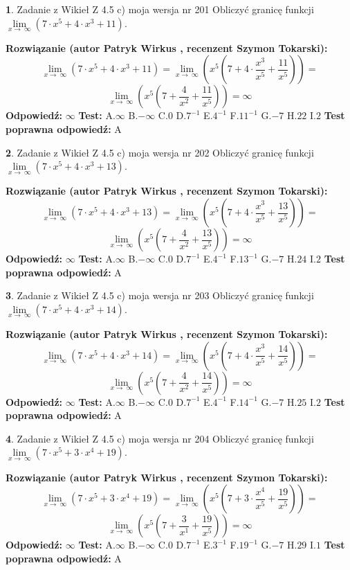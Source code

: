 \documentclass[12pt, a4paper]{article}
\theoremstyle{definition} %
\newtheorem{zad}{}
\newcommand{\zadStart}[1]{\begin{zad}#1\newline}
\newcommand{\zadStop}{\end{zad}}
\newcommand{\rozwStart}[2]{\noindent \textbf{Rozwiązanie (autor #1 , recenzent #2): }\newline}
\newcommand{\rozwStop}{\newline}
\newcommand{\odpStart}{\noindent \textbf{Odpowiedź:}\newline}
\newcommand{\odpStop}{\newline}
\newcommand{\testStart}{\noindent \textbf{Test:}\newline}
\newcommand{\testStop}{\newline}
\newcommand{\kluczStart}{\noindent \textbf{Test poprawna odpowiedź:}\newline}
\newcommand{\kluczStop}{\newline}
\begin{document}
\zadStart{Zadanie z Wikieł Z 4.5 c) moja wersja nr 201}
Obliczyć granicę funkcji  $\lim\limits_{x\to\ \infty}(7 \cdot x^{5}+4 \cdot x^{3}+11)$.
\zadStop
\rozwStart{Patryk Wirkus}{Szymon Tokarski}
$$\lim\limits_{x\to\ \infty}(7 \cdot x^{5}+4 \cdot x^{3}+11) = \lim\limits_{x\to\ \infty}(x^{5}(7 +4 \cdot \frac{x^{3}}{x^{5}}+\frac{11}{x^{5}})) =$$ $$\lim\limits_{x\to\ \infty}(x^{5}(7 +\frac{4}{x^{2}}+\frac{11}{x^{5}})) =\infty$$
\rozwStop
\odpStart
$\infty$
\odpStop
\testStart
A.$\infty$ B.$-\infty$ C.$0$ D.$7^{-1}$ E.$4^{-1}$
F.$11^{-1}$ G.$-7$
H.$22$
I.$2$
\testStop
\kluczStart
A
\kluczStop



\zadStart{Zadanie z Wikieł Z 4.5 c) moja wersja nr 202}
Obliczyć granicę funkcji  $\lim\limits_{x\to\ \infty}(7 \cdot x^{5}+4 \cdot x^{3}+13)$.
\zadStop
\rozwStart{Patryk Wirkus}{Szymon Tokarski}
$$\lim\limits_{x\to\ \infty}(7 \cdot x^{5}+4 \cdot x^{3}+13) = \lim\limits_{x\to\ \infty}(x^{5}(7 +4 \cdot \frac{x^{3}}{x^{5}}+\frac{13}{x^{5}})) =$$ $$\lim\limits_{x\to\ \infty}(x^{5}(7 +\frac{4}{x^{2}}+\frac{13}{x^{5}})) =\infty$$
\rozwStop
\odpStart
$\infty$
\odpStop
\testStart
A.$\infty$ B.$-\infty$ C.$0$ D.$7^{-1}$ E.$4^{-1}$
F.$13^{-1}$ G.$-7$
H.$24$
I.$2$
\testStop
\kluczStart
A
\kluczStop



\zadStart{Zadanie z Wikieł Z 4.5 c) moja wersja nr 203}
Obliczyć granicę funkcji  $\lim\limits_{x\to\ \infty}(7 \cdot x^{5}+4 \cdot x^{3}+14)$.
\zadStop
\rozwStart{Patryk Wirkus}{Szymon Tokarski}
$$\lim\limits_{x\to\ \infty}(7 \cdot x^{5}+4 \cdot x^{3}+14) = \lim\limits_{x\to\ \infty}(x^{5}(7 +4 \cdot \frac{x^{3}}{x^{5}}+\frac{14}{x^{5}})) =$$ $$\lim\limits_{x\to\ \infty}(x^{5}(7 +\frac{4}{x^{2}}+\frac{14}{x^{5}})) =\infty$$
\rozwStop
\odpStart
$\infty$
\odpStop
\testStart
A.$\infty$ B.$-\infty$ C.$0$ D.$7^{-1}$ E.$4^{-1}$
F.$14^{-1}$ G.$-7$
H.$25$
I.$2$
\testStop
\kluczStart
A
\kluczStop



\zadStart{Zadanie z Wikieł Z 4.5 c) moja wersja nr 204}
Obliczyć granicę funkcji  $\lim\limits_{x\to\ \infty}(7 \cdot x^{5}+3 \cdot x^{4}+19)$.
\zadStop
\rozwStart{Patryk Wirkus}{Szymon Tokarski}
$$\lim\limits_{x\to\ \infty}(7 \cdot x^{5}+3 \cdot x^{4}+19) = \lim\limits_{x\to\ \infty}(x^{5}(7 +3 \cdot \frac{x^{4}}{x^{5}}+\frac{19}{x^{5}})) =$$ $$\lim\limits_{x\to\ \infty}(x^{5}(7 +\frac{3}{x^{1}}+\frac{19}{x^{5}})) =\infty$$
\rozwStop
\odpStart
$\infty$
\odpStop
\testStart
A.$\infty$ B.$-\infty$ C.$0$ D.$7^{-1}$ E.$3^{-1}$
F.$19^{-1}$ G.$-7$
H.$29$
I.$1$
\testStop
\kluczStart
A
\kluczStop
\end{document}

